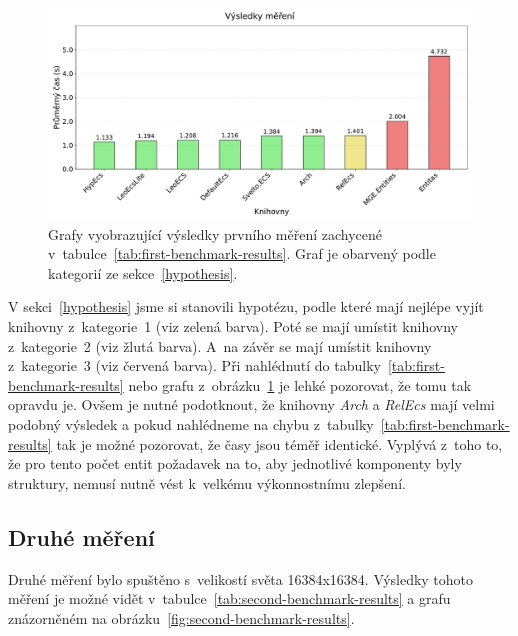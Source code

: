 \begin{figure}[!htb]
    \centering
    \includegraphics[width=1.0\linewidth]{plots/first_benchmark_results.pdf}
    \caption{Grafy vyobrazující výsledky prvního měření zachycené v~tabulce~\ref{tab:first-benchmark-results}. Graf je obarvený podle kategorií ze sekce~\ref{hypothesis}.}
    \label{fig:first-benchmark-results}
\end{figure}

V sekci~\ref{hypothesis} jsme si stanovili hypotézu, podle které mají nejlépe vyjít knihovny z~kategorie~1 (viz zelená barva). Poté se mají umístit knihovny z~kategorie~2 (viz žlutá barva). A~na závěr se mají umístit knihovny z~kategorie~3 (viz červená barva). Při nahlédnutí do tabulky~\ref{tab:first-benchmark-results} nebo grafu z~obrázku~\ref{fig:first-benchmark-results} je lehké pozorovat, že tomu tak opravdu je. Ovšem je nutné podotknout, že knihovny \textit{Arch} a \textit{RelEcs} mají velmi podobný výsledek a pokud nahlédneme na chybu z~tabulky~\ref{tab:first-benchmark-results} tak je možné pozorovat, že časy jsou téměř identické. Vyplývá z~toho to, že pro tento počet entit požadavek na to, aby jednotlivé komponenty byly struktury, nemusí nutně vést k~velkému výkonnostnímu zlepšení.

\subsection{Druhé měření}
Druhé měření bylo spuštěno s~velikostí světa 16384x16384. Výsledky tohoto měření je možné vidět v~tabulce~\ref{tab:second-benchmark-results} a grafu znázorněném na obrázku~\ref{fig:second-benchmark-results}.

